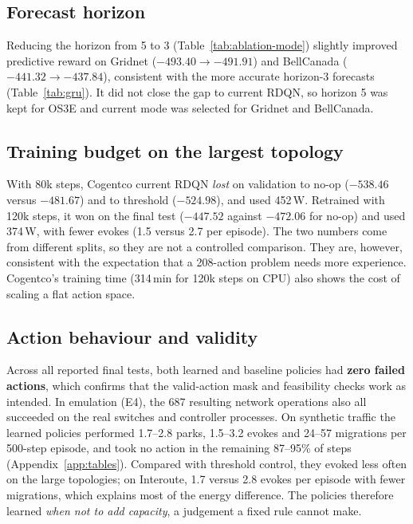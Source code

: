 \subsection{Forecast horizon}

Reducing the horizon from 5 to 3 (Table~\ref{tab:ablation-mode}) slightly improved predictive reward on Gridnet ($-493.40\rightarrow-491.91$) and BellCanada ($-441.32\rightarrow-437.84$), consistent with the more accurate horizon-3 forecasts (Table~\ref{tab:gru}). It did not close the gap to current RDQN, so horizon 5 was kept for OS3E and current mode was selected for Gridnet and BellCanada.

\subsection{Training budget on the largest topology}

With 80k steps, Cogentco current RDQN \emph{lost} on validation to no-op ($-538.46$ versus $-481.67$) and to threshold ($-524.98$), and used 452\,W. Retrained with 120k steps, it won on the final test ($-447.52$ against $-472.06$ for no-op) and used 374\,W, with fewer evokes (1.5 versus 2.7 per episode). The two numbers come from different splits, so they are not a controlled comparison. They are, however, consistent with the expectation that a 208-action problem needs more experience. Cogentco's training time (314\,min for 120k steps on CPU) also shows the cost of scaling a flat action space.

\subsection{Action behaviour and validity}

Across all reported final tests, both learned and baseline policies had \textbf{zero failed actions}, which confirms that the valid-action mask and feasibility checks work as intended. In emulation (E4), the 687 resulting network operations also all succeeded on the real switches and controller processes. On synthetic traffic the learned policies performed 1.7--2.8 parks, 1.5--3.2 evokes and 24--57 migrations per 500-step episode, and took no action in the remaining 87--95\% of steps (Appendix~\ref{app:tables}). Compared with threshold control, they evoked less often on the large topologies; on Interoute, 1.7 versus 2.8 evokes per episode with fewer migrations, which explains most of the energy difference. The policies therefore learned \emph{when not to add capacity}, a judgement a fixed rule cannot make.


